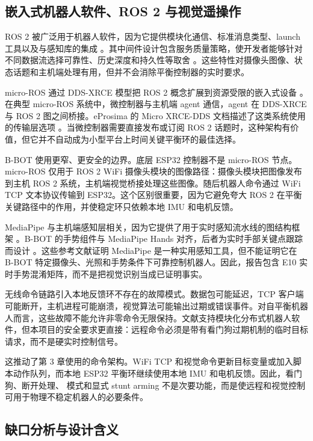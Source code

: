 \documentclass[12pt, a4paper]{article}
\begin{document}
\subsection{嵌入式机器人软件、ROS 2 与视觉遥操作}

ROS 2 被广泛用于机器人软件，因为它提供模块化通信、标准消息类型、launch 工具以及与感知库的集成 \cite{macenski2022ros2}。其中间件设计包含服务质量策略，使开发者能够针对不同数据流选择可靠性、历史深度和持久性等取舍 \cite{ros2_qos_design}。这些特性对摄像头图像、状态话题和主机端处理有用，但并不会消除平衡控制器的实时要求。

micro-ROS 通过 DDS-XRCE 模型把 ROS 2 概念扩展到资源受限的嵌入式设备 \cite{omg_ddsxrce,microros_docs}。在典型 micro-ROS 系统中，微控制器与主机端 agent 通信，agent 在 DDS-XRCE 与 ROS 2 图之间桥接。eProsima 的 Micro XRCE-DDS 文档描述了这类系统使用的传输层选项 \cite{eprosima_microxrcedds}。当微控制器需要直接发布或订阅 ROS 2 话题时，这种架构有价值，但它并不自动成为小型平台上时间关键平衡环的最佳选择。

B-BOT 使用更窄、更安全的边界。底层 ESP32 控制器不是 micro-ROS 节点。micro-ROS 仅用于 ROS 2 WiFi 摄像头模块的图像路径：摄像头模块把图像发布到主机 ROS 2 系统，主机端视觉桥接处理这些图像。随后机器人命令通过 WiFi TCP 文本协议传输到 ESP32。这个区别很重要，因为它避免夸大 ROS 2 在平衡关键路径中的作用，并使稳定环只依赖本地 IMU 和电机反馈。

MediaPipe 与主机端感知层相关，因为它提供了用于实时感知流水线的图结构框架 \cite{lugaresi2019mediapipe}。B-BOT 的手势组件与 MediaPipe Hands 对齐，后者为实时手部关键点跟踪而设计 \cite{zhang2020mediapipehands}。这些参考文献证明 MediaPipe 是一种实用感知工具，但不能证明它在 B-BOT 特定摄像头、光照和手势条件下可靠控制机器人。因此，报告包含 E10 实时手势混淆矩阵，而不是把视觉识别当成已证明事实。

无线命令链路引入本地反馈环不存在的故障模式。数据包可能延迟，TCP 客户端可能断开，主机进程可能崩溃，视觉算法可能输出过期或错误事件。对自平衡机器人而言，这些故障不能允许非零命令无限保持。文献支持模块化分布式机器人软件，但本项目的安全要求更直接：远程命令必须是带有看门狗过期机制的临时目标请求，而不是硬实时控制信号。

这推动了第 3 章使用的命令架构。WiFi TCP 和视觉命令更新目标变量或加入脚本动作队列，而本地 ESP32 平衡环继续使用本地 IMU 和电机反馈。因此，看门狗、断开处理、\texttt{} 模式和显式 stunt arming 不是次要功能，而是使远程和视觉控制可用于物理不稳定机器人的必要条件。

\subsection{缺口分析与设计含义}
\end{document}
